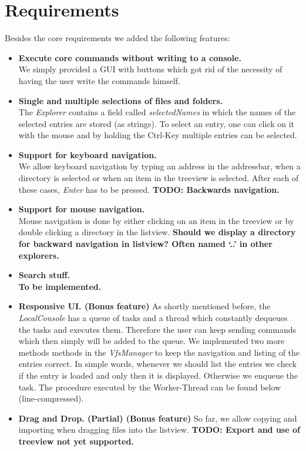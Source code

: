 \documentclass[a4paper,12pt]{article}
\begin{document}
\section{Requirements}
Besides the core requirements we added the following features:
\begin{itemize}
\item \textbf{Execute core commands without writing to a console.} \\
	We simply provided a GUI with buttons which got rid of the necessity of having the user write the commands himself.
\item \textbf{Single and multiple selections of files and folders.} \\
	The \emph{Explorer} contains a field called \emph{selectedNames} in which the names of the selected entries are stored (as strings). To select an 			entry, one can click on it with the mouse and by holding the Ctrl-Key multiple entries can be selected.
\item \textbf{Support for keyboard navigation.} \\
	We allow keyboard navigation by typing an address in the addressbar, when a directory is selected or when an item in the treeview is selected. After 	each of these cases, \emph{Enter} has to be pressed. \textbf{TODO: Backwards navigation.}
\item \textbf{Support for mouse navigation.} \\
	Mouse navigation is done by either clicking on an item in the treeview or by double clicking a directory in the listview. \textbf{Should we display a 			directory for backward navigation in listview? Often named `..' in other explorers.}
\item \textbf{Search stuff.} \\
	\textbf {To be implemented.}
\item \textbf {Responsive UI. (Bonus feature)}
	As shortly mentioned before, the \emph{LocalConsole} has a queue of tasks and a thread which constantly dequeues the tasks and executes them. 		Therefore the user can keep sending commands which then simply will be added to the queue. We implemented two more methods methods in 			the \emph{VfsManager} to keep the navigation and listing of the entries correct. In simple words, whenever we should list the entries we check if 			the entry is 	loaded and only then it is displayed. Otherwise we enqueue the task. The procedure executed by the Worker-Thread can be found 			below (line-compressed).
\item \textbf{Drag and Drop. (Partial) (Bonus feature)}
	So far, we allow copying and importing when dragging files into the listview. \textbf{TODO: Export and use of treeview not yet supported.}
\end{itemize}
\end{document}
